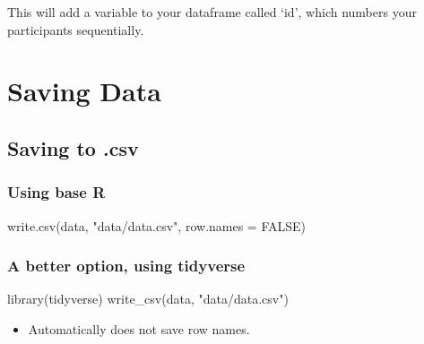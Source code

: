 \documentclass[
  letterpaper,
  DIV=11,
  numbers=noendperiod]{scrreprt}
\newenvironment{Shaded}{\begin{snugshade}}{\end{snugshade}}
\newcommand{\AttributeTok}[1]{\textcolor[rgb]{0.40,0.45,0.13}{#1}}
\newcommand{\ConstantTok}[1]{\textcolor[rgb]{0.56,0.35,0.01}{#1}}
\newcommand{\DecValTok}[1]{\textcolor[rgb]{0.68,0.00,0.00}{#1}}
\newcommand{\FunctionTok}[1]{\textcolor[rgb]{0.28,0.35,0.67}{#1}}
\newcommand{\NormalTok}[1]{\textcolor[rgb]{0.00,0.23,0.31}{#1}}
\newcommand{\SpecialCharTok}[1]{\textcolor[rgb]{0.37,0.37,0.37}{#1}}
\newcommand{\StringTok}[1]{\textcolor[rgb]{0.13,0.47,0.30}{#1}}
\providecommand{\tightlist}{%
  \setlength{\itemsep}{0pt}\setlength{\parskip}{0pt}}\usepackage{longtable,booktabs,array}
\begin{document}
\begin{Shaded}
\end{Shaded}

This will add a variable to your dataframe called `id', which numbers
your participants sequentially.

\chapter{Saving Data}\label{saving-data}

\section{Saving to .csv}\label{saving-to-.csv}

\subsection{Using base R}\label{using-base-r}

\begin{Shaded}
\begin{Highlighting}[]
\FunctionTok{write.csv}\NormalTok{(data, }\StringTok{"data/data.csv"}\NormalTok{, }\AttributeTok{row.names =} \ConstantTok{FALSE}\NormalTok{)}
\end{Highlighting}
\end{Shaded}

\subsection{A better option, using
tidyverse}\label{a-better-option-using-tidyverse}

\begin{Shaded}
\begin{Highlighting}[]
\FunctionTok{library}\NormalTok{(tidyverse)}
\FunctionTok{write\_csv}\NormalTok{(data, }\StringTok{"data/data.csv"}\NormalTok{)}
\end{Highlighting}
\end{Shaded}

\begin{itemize}
\tightlist
\item
  Automatically does not save row names.
\end{itemize}
\end{document}
